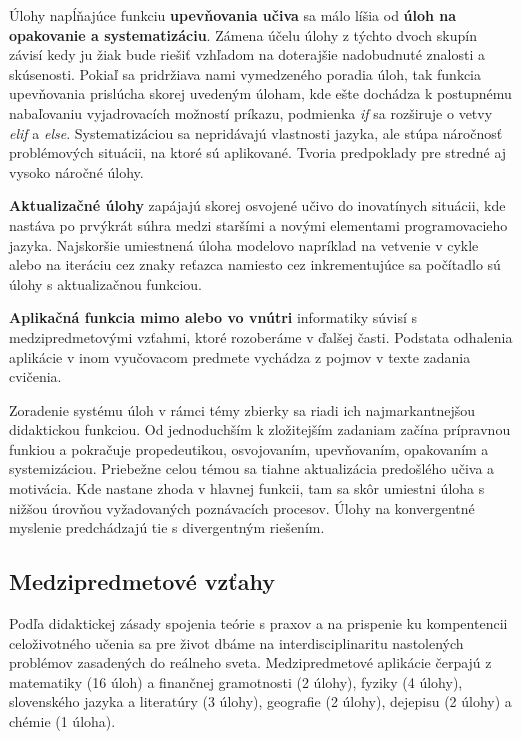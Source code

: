 Úlohy napĺňajúce funkciu \textbf{upevňovania učiva} sa málo líšia od \textbf{úloh na opakovanie a systematizáciu}. Zámena účelu úlohy z týchto dvoch skupín závisí kedy ju žiak bude riešiť vzhľadom na doterajšie nadobudnuté znalosti a skúsenosti. Pokiaľ sa pridržiava nami vymedzeného poradia úloh, tak funkcia upevňovania prislúcha skorej uvedeným úloham, kde ešte dochádza k postupnému nabaľovaniu vyjadrovacích možností príkazu, podmienka \emph{if} sa rozširuje o vetvy \emph{elif} a \emph{else}. Systematizáciou sa nepridávajú vlastnosti jazyka, ale stúpa náročnosť problémových situácii, na ktoré sú aplikované. Tvoria predpoklady pre stredné aj vysoko náročné úlohy.

\textbf{Aktualizačné úlohy} zapájajú skorej osvojené učivo do inovatínych situácii, kde nastáva po prvýkrát súhra medzi staršími a novými elementami programovacieho jazyka. Najskoršie umiestnená úloha modelovo napríklad na vetvenie v cykle alebo na iteráciu cez znaky reťazca namiesto cez inkrementujúce sa počítadlo sú úlohy s aktualizačnou funkciou.

\textbf{Aplikačná funkcia mimo alebo vo vnútri} informatiky súvisí s medzipredmetovými vzťahmi, ktoré rozoberáme v ďalšej časti. Podstata odhalenia aplikácie v inom vyučovacom predmete vychádza z pojmov v texte zadania cvičenia.

Zoradenie systému úloh v rámci témy zbierky sa riadi ich najmarkantnejšou didaktickou funkciou. Od jednoduchším k zložitejším zadaniam začína prípravnou funkiou a pokračuje propedeutikou, osvojovaním, upevňovaním, opakovaním a systemizáciou. Priebežne celou témou sa tiahne aktualizácia predošlého učiva a motivácia. Kde nastane zhoda v hlavnej funkcii, tam sa skôr umiestni úloha s nižšou úrovňou vyžadovaných poznávacích procesov. Úlohy na konvergentné myslenie predchádzajú tie s divergentným riešením.

\subsection{Medzipredmetové vzťahy}
Podľa didaktickej zásady spojenia teórie s praxov a na prispenie ku kompentencii celoživotného učenia sa pre život dbáme na interdisciplinaritu nastolených problémov zasadených do reálneho sveta. Medzipredmetové aplikácie čerpajú z matematiky (16 úloh) a finančnej gramotnosti (2 úlohy), fyziky (4 úlohy), slovenského jazyka a literatúry (3 úlohy), geografie (2 úlohy), dejepisu (2 úlohy) a chémie (1 úloha). 

